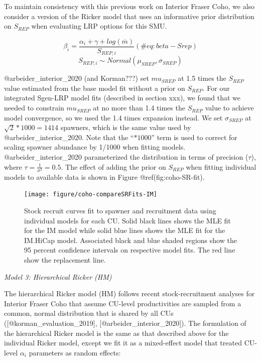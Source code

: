 \documentclass[
]{article}
\begin{document}
To maintain consistency with this previous work on Interior Fraser Coho,
we also consider a version of the Ricker model that uses an informative
prior distribution on \(S_{REP}\) when evaluating LRP options for this
SMU.

\begin{equation}
  \beta_i = \frac{\alpha_i + \gamma + log(\overline{m})}{S_{REP,i}}
   (\#eq:beta-Srep)
\end{equation} \begin{equation}
  S_{REP,i} \sim Normal(\mu_{SREP},\sigma_{SREP})
\end{equation}

@arbeider\_interior\_2020 (and Korman???) set \(mu_{SREP}\) at 1.5 times
the \(S_{REP}\) value estimated from the base model fit without a prior
on \(S_{REP}\). For our integrated Sgen-LRP model fits (described in
section xxx), we found that we needed to constrain \(mu_{SREP}\) at no
more than 1.4 times the \(S_{REP}\) value to achieve model convergence,
so we used the 1.4 times expansion instead. We set \(\sigma_{SREP}\) at
\(\sqrt{2} * 1000 = 1414\) spawners, which is the same value used by
@arbeider\_interior\_2020. Note that the ``\(* 1000\)'' term is used to
correct for scaling spawner abundance by 1/1000 when fitting models.
@arbeider\_interior\_2020 parameterized the distribution in terms of
precision (\(\tau\)), where \(\tau = \frac{1}{\sigma^2} = 0.5\). The
effect of adding the prior on \(S_{REP}\) when fitting individual models
to available data is shown in Figure @ref(fig:coho-SR-fit).

\begin{figure}

{\centering \texttt{[image: figure/coho-compareSRFits-IM]} 

}

\caption{Stock recruit curves fit to spawner and recruitment data using individual models for each CU. Solid black lines shows the MLE fit for the IM model while solid blue lines shows the MLE fit for the IM.HiCap model.  Associated black and blue shaded regions show the 95 percent confidence intervals on respective model fits. The red line show the replacement line.}\label{fig:coho-SR-fit}
\end{figure}

\emph{Model 3: Hierarchical Ricker (HM)}

The hierarchical Ricker model (HM) follows recent stock-recruitment
analyses for Interior Fraser Coho that assume CU-level productivities
are sampled from a common, normal distribution that is shared by all CUs
({[}@korman\_evaluation\_2019{]}, {[}@arbeider\_interior\_2020{]}). The
formulation of the hierarchical Ricker model is the same as that
described above for the individual Ricker model, except we fit it as a
mixed-effect model that treated CU-level \(\alpha_i\) parameters as
random effects:
\end{document}

